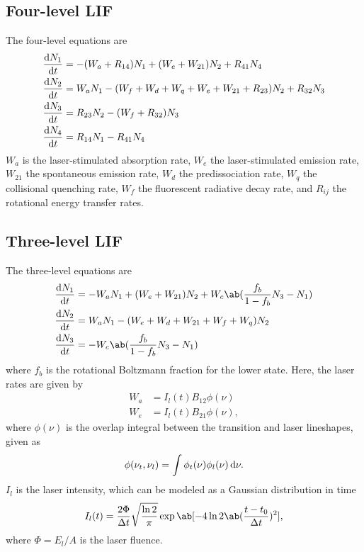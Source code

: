 \subsection{Four-level LIF}

The four-level equations are \cite[18]{grinsteadTemperatureMeasurementHighTemperature1995}
\begin{align*}
    \odv{N_1}{t} & = -(W_a + R_{14})N_1 + (W_e + W_{21})N_2 + R_{41}N_4                      \\
    \odv{N_2}{t} & = W_aN_1 - (W_f + W_d + W_q + W_e + W_{21} + R_{23})N_2 + R_{32}N_3 \\
    \odv{N_3}{t} & = R_{23}N_2 - (W_f + R_{32})N_3                                               \\
    \odv{N_4}{t} & = R_{14}N_1 - R_{41}N_4
\end{align*}
$W_a$ is the laser-stimulated absorption rate, $W_e$ the laser-stimulated emission rate, $W_{21}$ the spontaneous emission rate, $W_d$ the predissociation rate, $W_q$ the collisional quenching rate, $W_f$ the fluorescent radiative decay rate, and $R_{ij}$ the rotational energy transfer rates.

\subsection{Three-level LIF}

The three-level equations are \cite[2]{diskin3LevelModelSchumann1996}
\begin{align*}
    \odv{N_1}{t} & = -W_aN_1 + (W_e + W_{21})N_2 + W_c\ab(\frac{f_b}{1 - f_b}N_3 - N_1) \\
    \odv{N_2}{t} & = W_aN_1 - (W_e + W_d + W_{21} + W_f + W_q)N_2                           \\
    \odv{N_3}{t} & = -W_c\ab(\frac{f_b}{1 - f_b}N_3 - N_1)
\end{align*}
where $f_b$ is the rotational Boltzmann fraction for the lower state.
Here, the laser rates are given by
\begin{align*}
    W_a & = I_l(t)B_{12}\phi(\nu) \\
    W_e & = I_l(t)B_{21}\phi(\nu),
\end{align*}
where $\phi(\nu)$ is the overlap integral between the transition and laser lineshapes, given as
\begin{equation*}
    \phi(\nu_t, \nu_l) = \int \phi_t(\nu)\phi_l(\nu) \odif{\nu}.
\end{equation*}
$I_l$ is the laser intensity, which can be modeled as a Gaussian distribution in time
\begin{equation*}
    I_l(t) = \frac{2\Phi}{\adif{t}}\sqrt{\frac{\ln{2}}{\pi}}\exp\ab[-4\ln{2}\ab(\frac{t - t_0}{\adif{t}})^2],
\end{equation*}
where $\Phi = E_l/A$ is the laser fluence.
